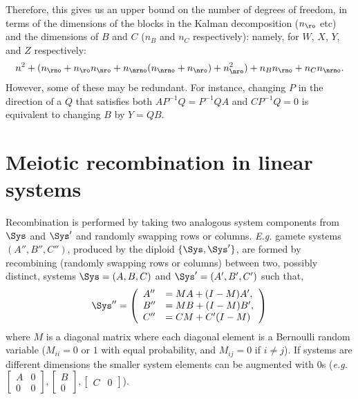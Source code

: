 Therefore, this gives us an upper bound on the number of degrees of freedom,
in terms of the dimensions of the blocks in the Kalman decomposition ($n_\ro$ etc)
and the dimensions of $B$ and $C$ ($n_B$ and $n_C$ respectively):
namely, for $W$, $X$, $Y$, and $Z$ respectively:
$$\begin{aligned}
    n^2 
    + (n_{\rno} + n_\ro n_\nro + n_\nrno(n_\nrno + n_\nro) + n_\nro^2)
    + n_B n_\rno
    + n_C n_\nrno .
\end{aligned}$$
However, some of these may be redundant.
For instance, changing $P$ in the direction of 
a $Q$ that satisfies both $A P^{-1} Q = P^{-1} Q A$ and $C P^{-1} Q = 0$
is equivalent to changing $B$ by $Y = QB$.

\section{Meiotic recombination in linear systems}\label{apx:recombination}

  Recombination is performed by taking two analogous system components from $\Sys$ and $\Sys'$ and randomly swapping rows or columns.
  \emph{E.g.} gamete systems $(A'', B'', C'')$, produced by the diploid $\{\Sys, \Sys'\}$, are formed by recombining (randomly swapping rows or columns) between two, possibly distinct, systems $\Sys = (A,B,C)$ and $\Sys' = (A', B', C')$ such that,
  \begin{align*}
    \Sys'' = \left( \begin{array}{ll}
    A'' &= MA + (I-M)A' , \\
    B'' &= MB + (I-M)B' , \\
    C'' &= CM + C'(I-M)
    \end{array} \right)
  \end{align*}
  where $M$ is a diagonal matrix where each diagonal element is a Bernoulli random variable ($M_{ii} = 0$ or $1$ with equal probability, and $M_{ij}=0$ if $i \neq j$). If systems are different dimensions the smaller system elements can be augmented with $0$s (\emph{e.g.} $\left[ \begin{smallmatrix} A & 0 \\ 0 & 0 \end{smallmatrix} \right], \left[ \begin{smallmatrix} B \\ 0 \end{smallmatrix} \right], \left[ \begin{smallmatrix} C & 0 \end{smallmatrix}\right]$).



